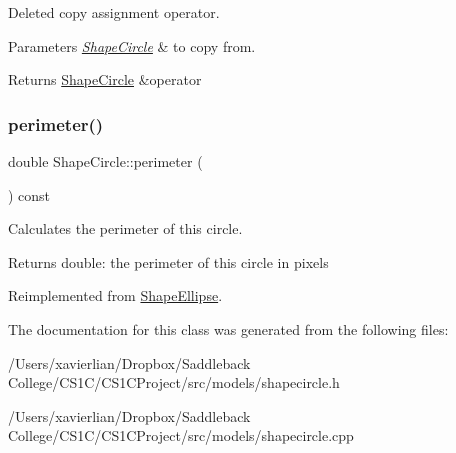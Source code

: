 Deleted copy assignment operator. 


\begin{DoxyParams}{Parameters}
{\em \mbox{\hyperlink{class_shape_circle}{Shape\+Circle}}} & to copy from. \\
\hline
\end{DoxyParams}
\begin{DoxyReturn}{Returns}
\mbox{\hyperlink{class_shape_circle}{Shape\+Circle}} \&operator 
\end{DoxyReturn}
\mbox{\label{class_shape_circle_ad393d13676b0d0fcb36346b9a90b74af}} 
\subsubsection{\texorpdfstring{perimeter()}{perimeter()}}
{\footnotesize\ttfamily double Shape\+Circle\+::perimeter (\begin{DoxyParamCaption}{ }\end{DoxyParamCaption}) const\hspace{0.3cm}{\ttfamily [virtual]}}



Calculates the perimeter of this circle. 

\begin{DoxyReturn}{Returns}
double\+: the perimeter of this circle in pixels 
\end{DoxyReturn}


Reimplemented from \mbox{\hyperlink{class_shape_ellipse_a397c01c912105854e065f6c2d766f73a}{Shape\+Ellipse}}.



The documentation for this class was generated from the following files\+:\begin{DoxyCompactItemize}
\item 
/\+Users/xavierlian/\+Dropbox/\+Saddleback College/\+C\+S1\+C/\+C\+S1\+C\+Project/src/models/shapecircle.\+h\item 
/\+Users/xavierlian/\+Dropbox/\+Saddleback College/\+C\+S1\+C/\+C\+S1\+C\+Project/src/models/shapecircle.\+cpp\end{DoxyCompactItemize}
